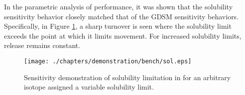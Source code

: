 In the parametric analysis of \Cyder performance, it was shown that the 
solubility sensitivity behavior closely matched that of the \gls{GDSM} 
sensitivity behaviors. Specifically, in Figure \ref{fig:sol_result}, a sharp turnover 
is seen where the solubility limit exceeds the point at which it limits 
movement. For increased solubility limits, release remains constant.

\begin{figure}[htbp!]
\begin{center}
\texttt{[image: ./chapters/demonstration/bench/sol.eps]}
\end{center}
\caption{Sensitivity demonstration of solubility limitation in \Cyder for an 
arbitrary isotope assigned a variable solubility limit. }
\label{fig:sol_result}
\end{figure}

